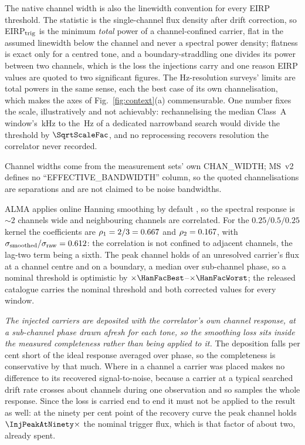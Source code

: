 The native channel width is also the linewidth convention for every EIRP
threshold. The statistic is the single-channel flux density after drift
correction, so EIRP$_{\rm trig}$ is the minimum \emph{total} power of a
channel-confined carrier, flat in the assumed linewidth below the channel and
never a spectral power density; flatness is exact only for a centred tone,
and a boundary-straddling one divides its power between two channels, which
is the loss the injections carry and one reason EIRP values are quoted to two
significant figures. The Hz-resolution
surveys' limits are total powers in the same sense, each the best case of
its own channelisation, which makes the axes of Fig.~\ref{fig:context}(a)
commensurable. One number fixes the scale, illustratively and not
achievably: rechannelising the median Class~A window's
\SqrtScaleChanKHz\,kHz to the \SETIChanHz\,Hz of a dedicated narrowband
search would divide the threshold by $\SqrtScaleFac$, and no reprocessing
recovers resolution the correlator never recorded.

Channel widths come from the measurement sets' own CHAN\_WIDTH; MS~v2
defines no ``EFFECTIVE\_BANDWIDTH'' column, so the quoted channelisations are
separations and are not claimed to be noise bandwidths.

ALMA applies online Hanning smoothing by default \citep{ALMAHandbook}, so
the spectral response is ${\sim}2$ channels wide and neighbouring channels
are correlated. For the $0.25/0.5/0.25$ kernel the coefficients
are $\rho_1=2/3=0.667$ and $\rho_2=0.167$, with
$\sigma_{\rm smoothed}/\sigma_{\rm raw}=0.612$: the correlation is
not confined to adjacent channels, the lag-two term being a sixth. The peak
channel holds \HanBest{} of an unresolved carrier's flux at a channel centre
and \HanWorst{} on a boundary, a median \HanMed{} over sub-channel phase, so
a nominal threshold is optimistic by
$\times\HanFacBest$--$\times\HanFacWorst$; the released catalogue carries the
nominal threshold and both corrected values for every window.

\emph{The injected carriers are deposited with the correlator's own channel
response, at a sub-channel phase drawn afresh for each tone, so the smoothing
loss sits inside the measured completeness rather than being applied to it.}
The deposition falls \InjShortPct{} per cent short of the ideal response
averaged over phase, so the completeness is conservative by that much. Where
in a channel a carrier was placed makes no difference to its recovered
signal-to-noise, because a carrier at a typical searched drift rate crosses
about \InjDriftChan{} channels during one observation and so samples the
whole response. Since the loss is carried end to end it must not be applied
to the result as well: at the ninety per cent point of the recovery curve the
peak channel holds $\InjPeakAtNinety\times$ the nominal trigger flux, which
is that factor of about two, already spent.

